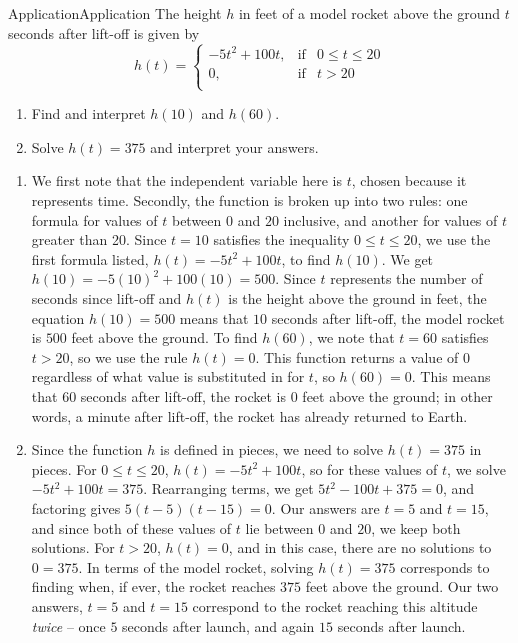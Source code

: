 \begin{example}{Application}{Application}
	The height $h$ in feet of a model rocket above the ground $t$ seconds after lift-off is given by \[ h(t) = \left\{ \begin{array}{rcl} -5t^2 + 100t, & \mbox{if} & 0 \leq t \leq 20 \\ 0, & \mbox{if} & t > 20 \\ \end{array} \right.\]
	\begin{enumerate}
		
		\item Find and interpret $h(10)$ and $h(60)$.
		
		\item Solve $h(t) = 375$ and interpret your answers.
	\end{enumerate}
\end{example}
\begin{solution}
	\begin{enumerate} 
\item We first note that the independent variable here is $t$, chosen because it represents time.  Secondly, the function is broken up into two rules:  one formula for values of $t$ between $0$ and $20$ inclusive, and another for values of $t$ greater than 20. Since $t=10$ satisfies the inequality $0 \leq t \leq 20$,  we use the first formula listed,  $h(t) = -5t^2 + 100t$, to find $h(10)$.  We get $h(10) = -5(10)^2 + 100(10) = 500$.  Since $t$ represents the number of seconds since lift-off and $h(t)$ is the height above the ground in feet, the equation $h(10) = 500$ means that $10$ seconds after lift-off, the model rocket is $500$ feet above the ground. To find $h(60)$, we note that $t=60$ satisfies $t > 20$, so we use the rule $h(t) = 0$.  This function returns a value of $0$ regardless of what value is substituted in for $t$, so $h(60) = 0$.  This means that $60$ seconds after lift-off, the rocket is $0$ feet above the ground;  in other words, a minute after lift-off, the rocket has already returned to Earth.

\item Since the function $h$ is defined in pieces, we need to solve $h(t) = 375$ in pieces.  For $0 \leq t \leq 20$, $h(t) =  -5t^2 + 100t$, so for these values of $t$, we solve $-5t^2 + 100t = 375$.  Rearranging terms, we get $5t^2 - 100t + 375 = 0$, and factoring gives $5(t-5)(t-15) = 0$. Our answers are  $t=5$ and $t=15$, and since both of these values of $t$ lie between $0$ and $20$, we keep both solutions.  For $t>20$, $h(t) = 0$, and in this case, there are no solutions to $0=375$.  In terms of the model rocket,  solving $h(t) = 375$ corresponds to finding when, if ever, the rocket reaches $375$ feet above the ground. Our two answers, $t=5$ and $t=15$ correspond to the rocket reaching this altitude \textit{twice} -- once $5$ seconds after launch, and again $15$ seconds after launch.
\end{enumerate}
\end{solution}	

